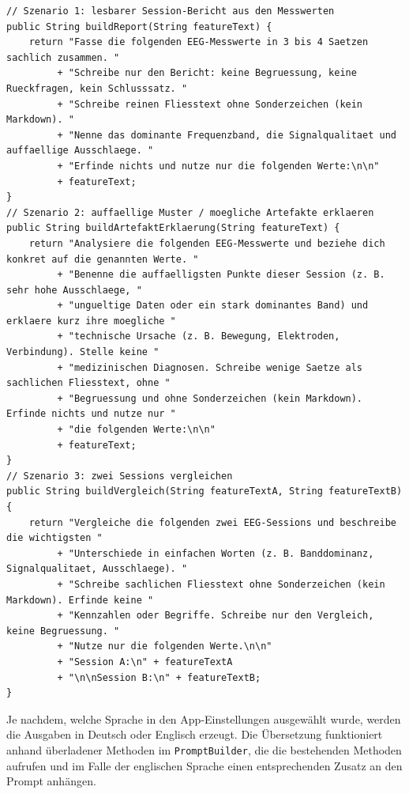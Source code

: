 \begin{lstlisting}[style=code, breaklines=true, caption={[Prompts je Szenario]Aufbau der Prompts je Szenario in der finalen, eingefrorenen Fassung. Alle drei enden mit dem aufbereiteten Merkmalstext.}, label={lst:prompts}]
// Szenario 1: lesbarer Session-Bericht aus den Messwerten
public String buildReport(String featureText) {
    return "Fasse die folgenden EEG-Messwerte in 3 bis 4 Saetzen sachlich zusammen. "
         + "Schreibe nur den Bericht: keine Begruessung, keine Rueckfragen, kein Schlusssatz. "
         + "Schreibe reinen Fliesstext ohne Sonderzeichen (kein Markdown). "
         + "Nenne das dominante Frequenzband, die Signalqualitaet und auffaellige Ausschlaege. "
         + "Erfinde nichts und nutze nur die folgenden Werte:\n\n"
         + featureText;
}
// Szenario 2: auffaellige Muster / moegliche Artefakte erklaeren
public String buildArtefaktErklaerung(String featureText) {
    return "Analysiere die folgenden EEG-Messwerte und beziehe dich konkret auf die genannten Werte. "
         + "Benenne die auffaelligsten Punkte dieser Session (z. B. sehr hohe Ausschlaege, "
         + "ungueltige Daten oder ein stark dominantes Band) und erklaere kurz ihre moegliche "
         + "technische Ursache (z. B. Bewegung, Elektroden, Verbindung). Stelle keine "
         + "medizinischen Diagnosen. Schreibe wenige Saetze als sachlichen Fliesstext, ohne "
         + "Begruessung und ohne Sonderzeichen (kein Markdown). Erfinde nichts und nutze nur "
         + "die folgenden Werte:\n\n"
         + featureText;
}
// Szenario 3: zwei Sessions vergleichen
public String buildVergleich(String featureTextA, String featureTextB) {
    return "Vergleiche die folgenden zwei EEG-Sessions und beschreibe die wichtigsten "
         + "Unterschiede in einfachen Worten (z. B. Banddominanz, Signalqualitaet, Ausschlaege). "
         + "Schreibe sachlichen Fliesstext ohne Sonderzeichen (kein Markdown). Erfinde keine "
         + "Kennzahlen oder Begriffe. Schreibe nur den Vergleich, keine Begruessung. "
         + "Nutze nur die folgenden Werte.\n\n"
         + "Session A:\n" + featureTextA
         + "\n\nSession B:\n" + featureTextB;
}
\end{lstlisting}

\noindent Je nachdem, welche Sprache in den App-Einstellungen ausgewählt wurde, werden die Ausgaben in Deutsch oder Englisch erzeugt. Die Übersetzung funktioniert anhand überladener Methoden im \texttt{PromptBuilder}, die die bestehenden Methoden aufrufen und im Falle der englischen Sprache einen entsprechenden Zusatz an den Prompt anhängen.

